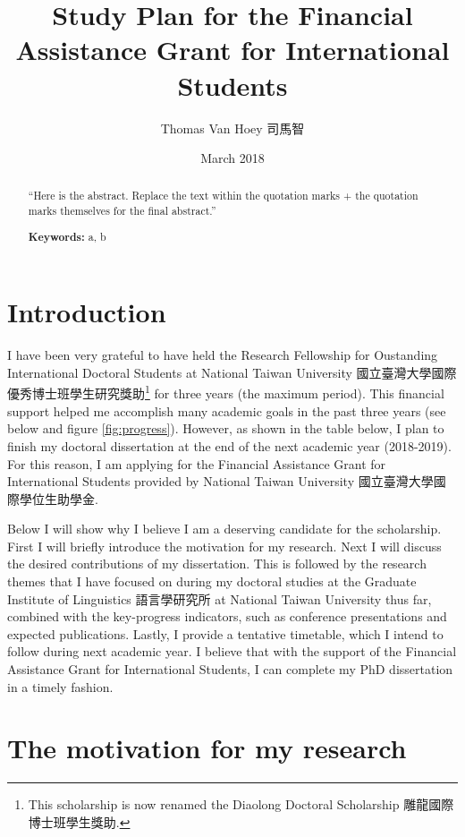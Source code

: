 \documentclass[12pt,]{article}
\title{Study Plan for the Financial Assistance Grant for International Students}
\author{Thomas Van Hoey 司馬智}
\date{March 2018}
\let\rmarkdownfootnote\footnote%
\def\footnote{\protect\rmarkdownfootnote}
\theoremstyle{definition}
\theoremstyle{definition}
\theoremstyle{definition}
\theoremstyle{remark}
\begin{document}
\maketitle
\begin{abstract}
\noindent ``Here is the abstract. Replace the text within the quotation
marks + the quotation marks themselves for the final abstract.''
\par \textbf{Keywords:} a, b
\end{abstract}

\setlength{\parindent}{0.5cm} %
\setlength{\parskip}{0em} %

\section{Introduction}\label{introduction}

I have been very grateful to have held the Research Fellowship for
Oustanding International Doctoral Students at National Taiwan University
國立臺灣大學國際優秀博士班學生研究獎助\footnote{This scholarship is now
  renamed the Diaolong Doctoral Scholarship 雕龍國際博士班學生獎助.} for
three years (the maximum period). This financial support helped me
accomplish many academic goals in the past three years (see below and
figure \ref{fig:progress}). However, as shown in the table below, I plan
to finish my doctoral dissertation at the end of the next academic year
(2018-2019). For this reason, I am applying for the Financial Assistance
Grant for International Students provided by National Taiwan University
國立臺灣大學國際學位生助學金.

Below I will show why I believe I am a deserving candidate for the
scholarship. First I will briefly introduce the motivation for my
research. Next I will discuss the desired contributions of my
dissertation. This is followed by the research themes that I have
focused on during my doctoral studies at the Graduate Institute of
Linguistics 語言學研究所 at National Taiwan University thus far,
combined with the key-progress indicators, such as conference
presentations and expected publications. Lastly, I provide a tentative
timetable, which I intend to follow during next academic year. I believe
that with the support of the Financial Assistance Grant for
International Students, I can complete my PhD dissertation in a timely
fashion.

\section{The motivation for my
research}\label{the-motivation-for-my-research}
\end{document}
